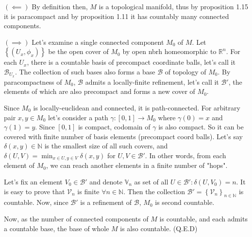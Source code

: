 \documentclass[a4paper]{article}
\begin{document}
\begin{exercise}[1-5]
    $(\impliedby)$ By definition then, $M$ is a topological manifold, thus
    by proposition 1.15 it is paracompact and by proposition 1.11 it has
    countably many connected components.

    $(\implies)$ Let's examine a single connected component $M_0$ of $M$.
    Let $\left\{ (U_x, \phi_x) \right\}$ be the open cover of $M_0$ by open nbrh
    homeomorphic to $\mathbb{R}^n$. For each $U_x$, there is a countable
    basis of precompact coordinate balls, let's call it $\mathcal{B}_{U_x}$. The
    collection of such bases also forms a base $\mathcal{B}$ of topology of
    $M_0$. By paracompactness of $M_0$, $\mathcal{B}$ admits a locally-finite
    refinement, let's call it $\mathcal{B}'$, the elements of which are also
    precompact and forms a new cover of $M_0$.

    Since $M_0$ is locally-euclidean and connected, it is path-connected.
    For arbitrary pair $x, y \in M_0$ let's consider a path
    $\gamma \colon [0, 1] \to M_0$ where $\gamma(0) = x$ and $\gamma(1) = y$.
    Since $[0,1]$ is compact, codomain of $\gamma$ is also compact. So it can be
    covered with finite number of basis elements (precompact coord balls).
    Let's say $\delta(x,y) \in \mathbb{N}$ is the smallest size of all such covers,
    and $\delta(U, V) = \min_{x \in U, y \in V} \delta(x,y)$ for $U, V \in \mathcal{B}'$.
    In other words, from each element of $M_0$, we can reach another elements
    in a finite number of "hops".

    Let's fix an element $V_0 \in \mathcal{B}'$ and denote $\mathbb{V}_n$ as set
    of all $U \in \mathcal{B}' \colon \delta(U, V_0) = n$. It is easy to prove
    that $\mathcal{V}_n$ is finite $\forall n \in \mathbb{N}$. Then the collection
    $\mathcal{B}' = \left\{ \mathcal{V}_n \right\}_{n \in \mathbb{N}}$ is countable.
    Now, since $\mathcal{B}'$ is a refinement of $\mathcal{B}$, $M_0$ is
    second countable.

    Now, as the number of connected components of $M$ is countable, and each
    admits a countable base, the base of whole $M$ is also countable. (Q.E.D)
\end{exercise}
\end{document}
